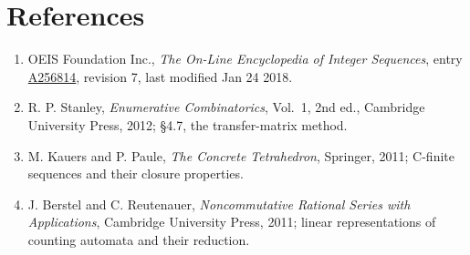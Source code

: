 \documentclass[11pt]{article}
\theoremstyle{definition}
\begin{document}
\section{References}

\begin{enumerate}

\item OEIS Foundation Inc., \emph{The On-Line Encyclopedia of Integer Sequences}, entry \href{https://oeis.org/A256814}{A256814}, revision 7, last modified Jan 24 2018.

\item R. P. Stanley, \emph{Enumerative Combinatorics}, Vol.~1, 2nd ed., Cambridge University Press, 2012; \S4.7, the transfer-matrix method.

\item M. Kauers and P. Paule, \emph{The Concrete Tetrahedron}, Springer, 2011; C-finite sequences and their closure properties.

\item J. Berstel and C. Reutenauer, \emph{Noncommutative Rational Series with Applications}, Cambridge University Press, 2011; linear representations of counting automata and their reduction.

\end{enumerate}
\end{document}
